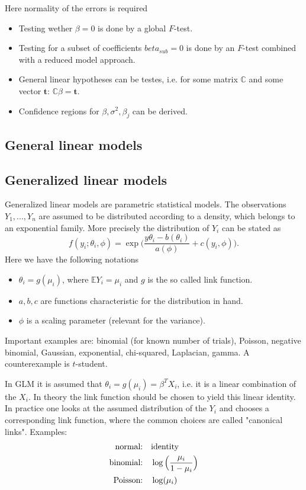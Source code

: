 \documentclass[12pt,a4paper]{amsart}
\theoremstyle{definition}
\theoremstyle{remark}
\numberwithin{equation}{section}
\begin{document}
\begin{itemize}
Here normality of the errors is required
\begin{itemize}
\item Testing wether $\beta=0$ is done by a global $F$-test.
\item Testing for a subset of coefficients $beta_{sub}=0$ is done by an $F$-test combined with a reduced model approach.
\item General linear hypotheses can be testes, i.e. for some matrix $\mathbb{C}$ and some vector $\mathbf{t}$: $\mathbb{C}\beta=\mathbf{t}$.
\item Confidence regions for $\beta, \sigma^2, \beta_j$ can be derived. 
\end{itemize}
\end{itemize}

\subsection{General linear models}

\subsection{Generalized linear models} %

Generalized linear models are parametric statistical models. The observations $Y_1,...,Y_n$ are assumed to be distributed according to a density, which belongs to an exponential family. More precisely the distribution of $Y_i$ can be stated as
$$ f(y_i; \theta_i, \phi)= \exp \Big(\frac{y \theta_i - b(\theta_i)}{a(\phi)}+c(y_i, \phi) \Big).$$
Here we have the following notations
\begin{itemize}
\item $\theta_i=g(\mu_i)$, where $\mathbb{E}Y_i=\mu_i$ and $g$ is the so called link function. 
\item $a, b, c$ are functions characteristic for the distribution in hand.
\item $\phi$ is a scaling parameter (relevant for the variance).
\end{itemize}

Important examples are: binomial (for known number of trials), Poisson, negative binomial, Gaussian, exponential, chi-squared, Laplacian, gamma. A counterexample is $t$-student.

In GLM it is assumed that $\theta_i =g(\mu_i)= \beta^T X_i$, i.e. it is a linear combination of the $X_i$. In theory the link function should be chosen to yield this linear identity. In practice one looks at the assumed distribution of the $Y_i$ and chooses a corresponding link function, where the common choices are called "canonical links". Examples: 
\begin{align*} 
\textnormal{normal:} & \quad \textnormal{identity} \\
\textnormal{binomial:} & \quad \log\Big( \frac{\mu_i}{1-\mu_i}\Big) \\
\textnormal{Poisson:} & \quad \log(\mu_i)
\end{align*}
\end{document}
